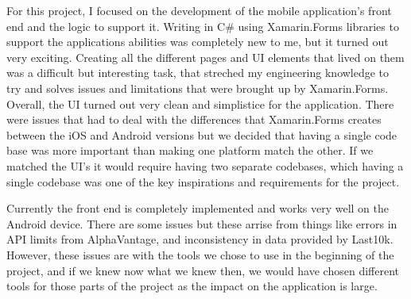 \documentclass[letterpaper,10pt,titlepage,journal,compsoc,draftclsnofoot,onecolumn]{IEEEtran}
\begin{document}
For this project, I focused on the development of the mobile application's front end and the logic to support it. Writing in C\# using Xamarin.Forms libraries to support the applications abilities
was completely new to me, but it turned out very exciting. Creating all the different pages and UI elements that lived on them was a difficult but interesting task, that streched my engineering knowledge to try and solves issues and limitations that were brought up by Xamarin.Forms. Overall, the UI turned out very clean and simplistice for the application. There were issues that had to deal with the differences that Xamarin.Forms creates between the iOS and Android versions but we decided that having a single code base was more important than making one platform match the other. If we matched the UI's it would require having two separate codebases, which having a single codebase was one of the key inspirations and requirements for the project.

Currently the front end is completely implemented and works very well on the Android device. There are some issues but these arrise from things like errors in API limits from AlphaVantage, and inconsistency in data provided by Last10k. However, these issues are with the tools we chose to use in the beginning of the project, and if we knew now what we knew then, we would have chosen different tools for those parts of the project as the impact on the application is large.
\end{document}
